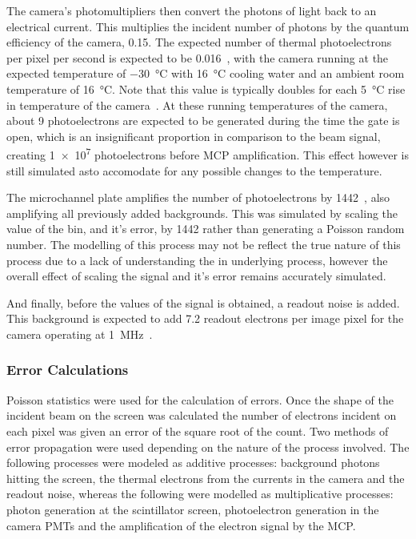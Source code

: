 The camera's photomultipliers then convert the photons of light back to an
electrical current. This multiplies the incident number of photons by the
quantum efficiency of the camera, \num{0.15}.  The expected number of thermal
photoelectrons per pixel per second is expected to be
\num{0.016}~\cite{istarscmos}, with the camera running at the expected
temperature of \SI{-30}{\celsius} with \SI{16}{\celsius} cooling water and an
ambient room temperature of \SI{16}{\celsius}. Note that this value is typically
doubles for each \SI{5}{\celsius} rise in temperature of the
camera~\cite{istarscmos}.  At these running temperatures of the camera, about 9
photoelectrons are expected to be generated during the time the gate is open,
which is an insignificant proportion in comparison to the beam signal, creating
\num{1e7} photoelectrons before MCP amplification. This effect however is still
simulated asto accomodate for any possible changes to the temperature.

The microchannel plate amplifies the number of photoelectrons by
\num{1442}~\cite{istarscmos}, also amplifying all previously added backgrounds.
This was simulated by scaling the value of the bin, and it's error, by
\num{1442} rather than generating a Poisson random number. The modelling of this
process may not be reflect the true nature of this process due to a lack of
understanding the in underlying process, however the overall effect of scaling
the signal and it's error remains accurately simulated.

And finally, before the values of the signal is obtained, a readout noise is
added. This background is expected to add \num{7.2} readout electrons per image
pixel for the camera operating at \SI{1}{\mega\hertz}~\cite{istarscmos}.

\subsubsection{Error Calculations}

Poisson statistics were used for the calculation of errors.  Once the shape of
the incident beam on the screen was calculated the number of electrons incident
on each pixel was given an error of the square root of the count. Two methods of
error propagation were used depending on the nature of the process involved.
The following processes were modeled as additive processes: background photons
hitting the screen, the thermal electrons from the currents in the camera and
the readout noise, whereas the following were modelled as multiplicative
processes: photon generation at the scintillator screen, photoelectron
generation in the camera PMTs and the amplification of the electron signal by
the MCP.

